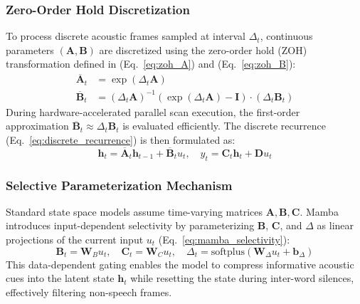 \documentclass[journal]{IEEEtran}
\begin{document}
\subsubsection{Zero-Order Hold Discretization}
To process discrete acoustic frames sampled at interval $\Delta_t$, continuous parameters $(\mathbf{A}, \mathbf{B})$ are discretized using the zero-order hold (ZOH) transformation defined in (Eq.~\ref{eq:zoh_A}) and (Eq.~\ref{eq:zoh_B}):
\begin{align}
\overline{\mathbf{A}}_t &= \exp(\Delta_t \mathbf{A}) \label{eq:zoh_A} \\
\overline{\mathbf{B}}_t &= (\Delta_t \mathbf{A})^{-1} (\exp(\Delta_t \mathbf{A}) - \mathbf{I}) \cdot (\Delta_t \mathbf{B}_t) \label{eq:zoh_B}
\end{align}
During hardware-accelerated parallel scan execution, the first-order approximation $\overline{\mathbf{B}}_t \approx \Delta_t \mathbf{B}_t$ is evaluated efficiently. The discrete recurrence (Eq.~\ref{eq:discrete_recurrence}) is then formulated as:
\begin{equation}
\mathbf{h}_t = \overline{\mathbf{A}}_t\mathbf{h}_{t-1} + \overline{\mathbf{B}}_t u_t, \quad y_t = \mathbf{C}_t\mathbf{h}_t + \mathbf{D}u_t
\label{eq:discrete_recurrence}
\end{equation}

\subsubsection{Selective Parameterization Mechanism}
Standard state space models assume time-varying matrices $\mathbf{A}, \mathbf{B}, \mathbf{C}$. Mamba introduces input-dependent selectivity by parameterizing $\mathbf{B}$, $\mathbf{C}$, and $\Delta$ as linear projections of the current input $u_t$ (Eq.~\ref{eq:mamba_selectivity}):
\begin{equation}
\mathbf{B}_t = \mathbf{W}_B u_t, \quad \mathbf{C}_t = \mathbf{W}_C u_t, \quad \Delta_t = \text{softplus}(\mathbf{W}_\Delta u_t + \mathbf{b}_\Delta)
\label{eq:mamba_selectivity}
\end{equation}
This data-dependent gating enables the model to compress informative acoustic cues into the latent state $\mathbf{h}_t$ while resetting the state during inter-word silences, effectively filtering non-speech frames.
\end{document}
